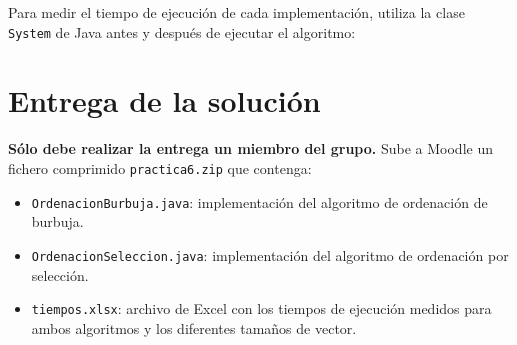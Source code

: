 \documentclass[
  spanish,
  11pt,
  a4paper,
  DIV=11,
  numbers=noendperiod]{scrartcl}
\providecommand{\tightlist}{\setlength{\itemsep}{0pt}\setlength{\parskip}{0pt}}
\begin{document}
Para medir el tiempo de ejecución de cada implementación, utiliza la clase \texttt{System} de Java antes y después de ejecutar el algoritmo:


\section{Entrega de la solución}\label{entrega-de-la-solucion}

\textbf{Sólo debe realizar la entrega un miembro del grupo.} Sube a Moodle un fichero comprimido \texttt{practica6.zip} que contenga:

\begin{itemize}
\tightlist
\item \texttt{OrdenacionBurbuja.java}: implementación del algoritmo de ordenación de burbuja.
\item \texttt{OrdenacionSeleccion.java}: implementación del algoritmo de ordenación por selección.
\item \texttt{tiempos.xlsx}: archivo de Excel con los tiempos de ejecución medidos para ambos algoritmos y los diferentes tamaños de vector.
\end{itemize}
\end{document}
